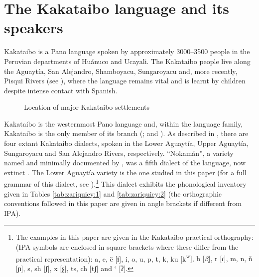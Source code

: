 \documentclass[output=paper,colorlinks,citecolor=brown,modfonts,nonflat]{langscibook}
\begin{document}
\section{The Kakataibo language and its speakers}\label{sec:zariquiey:2}

Kakataibo is a Pano language spoken by approximately 3000--3500 people in the Peruvian departments of Huánuco and Ucayali. The Kakataibo people live along the Aguaytía, San Alejandro, Shamboyacu, Sungaroyacu and, more recently, Pisqui Rivers (see ), where the language remains vital and is learnt by children despite intense contact with Spanish.

\begin{figure}
    \caption{Location of major Kakataibo settlements}
    \label{fig:zariquiey:1}
\end{figure}

Kakataibo is the westernmost Pano language and, within the language family, Kakataibo is the only member of its branch (\citealt{Shell1965, dAns1973, Loos1999}; and \citealt{Fleck2013}). As described in \citet{Zariquiey2011}, there are four extant Kakataibo dialects, spoken in the Lower Aguaytía, Upper Aguaytía, Sungaroyacu and San Alejandro Rivers, respectively. “Nokamán”, a variety named and minimally documented by \citet{Tessman1930}, was a fifth dialect of the language, now extinct \citep{Zariquiey2013}. The Lower Aguaytía variety is the one studied in this paper (for a full grammar of this dialect, see \citealt{Zariquiey2018}).\footnote{ \textrm{The examples in this paper are given in the Kakataibo practical orthography: (IPA symbols are enclosed in square brackets where these differ from the practical representation): a, e, ë [ɨ], i, o, u, p, t, k, ku [k}\textrm{\textsuperscript{w}}\textrm{], b [$\beta ̞$], r [ɾ], m, n, ñ [ɲ], s, sh [ʃ], x [ʂ], ts, ch [tʃ] and ‘ [ʔ].} } This dialect exhibits the phonological inventory given in Tables \ref{tab:zariquiey:1} and \ref{tab:zariquiey:2} (the orthographic conventions followed in this paper are given in angle brackets if different from IPA).

\begin{table}
    \caption{Kakataibo consonant inventory}
    \label{tab:zariquiey:1}
\end{table}
\end{document}
